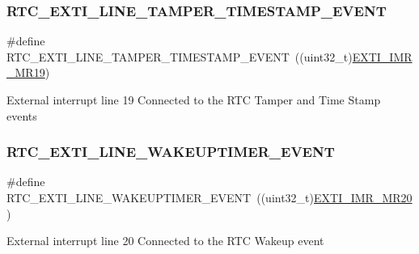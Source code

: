 \subsubsection{\texorpdfstring{R\+T\+C\+\_\+\+E\+X\+T\+I\+\_\+\+L\+I\+N\+E\+\_\+\+T\+A\+M\+P\+E\+R\+\_\+\+T\+I\+M\+E\+S\+T\+A\+M\+P\+\_\+\+E\+V\+E\+NT}{RTC\_EXTI\_LINE\_TAMPER\_TIMESTAMP\_EVENT}}
{\footnotesize\ttfamily \#define R\+T\+C\+\_\+\+E\+X\+T\+I\+\_\+\+L\+I\+N\+E\+\_\+\+T\+A\+M\+P\+E\+R\+\_\+\+T\+I\+M\+E\+S\+T\+A\+M\+P\+\_\+\+E\+V\+E\+NT~((uint32\+\_\+t)\hyperlink{group___peripheral___registers___bits___definition_gad47f7a023cbba165dfb95845d3c8c55c}{E\+X\+T\+I\+\_\+\+I\+M\+R\+\_\+\+M\+R19})}

External interrupt line 19 Connected to the R\+TC Tamper and Time Stamp events \mbox{\label{group___r_t_c_ex___private___constants_ga1a1a58e244663850786c387bfa5474f2}} 
\subsubsection{\texorpdfstring{R\+T\+C\+\_\+\+E\+X\+T\+I\+\_\+\+L\+I\+N\+E\+\_\+\+W\+A\+K\+E\+U\+P\+T\+I\+M\+E\+R\+\_\+\+E\+V\+E\+NT}{RTC\_EXTI\_LINE\_WAKEUPTIMER\_EVENT}}
{\footnotesize\ttfamily \#define R\+T\+C\+\_\+\+E\+X\+T\+I\+\_\+\+L\+I\+N\+E\+\_\+\+W\+A\+K\+E\+U\+P\+T\+I\+M\+E\+R\+\_\+\+E\+V\+E\+NT~((uint32\+\_\+t)\hyperlink{group___peripheral___registers___bits___definition_ga4aee679baf5820e1666b60e48a64cafa}{E\+X\+T\+I\+\_\+\+I\+M\+R\+\_\+\+M\+R20})}

External interrupt line 20 Connected to the R\+TC Wakeup event 